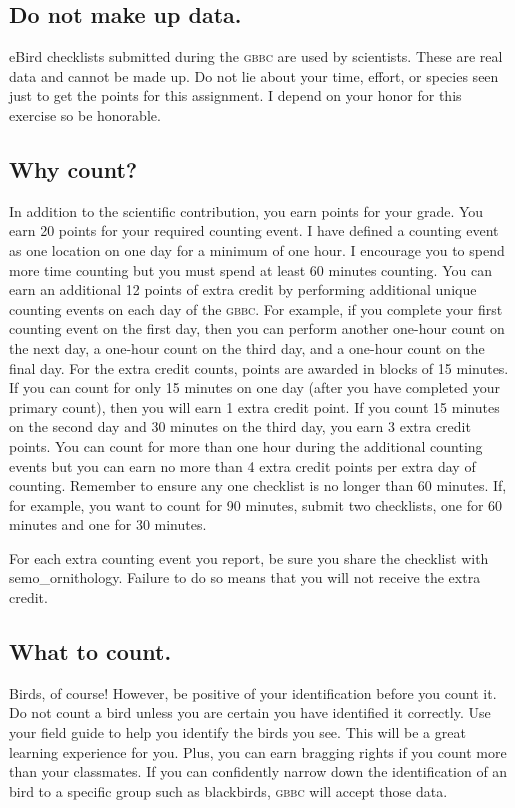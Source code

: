 \documentclass[11pt]{article}
\begin{document}
\subsection*{Do not make up data.}

eBird checklists submitted during the \textsc{gbbc} are used by scientists. These are real data and cannot be made up.  Do not lie about your time, effort, or species seen just to get the points for this assignment. I depend on your honor for this exercise so be honorable.

\subsection*{Why count?}
In addition to the scientific contribution, you earn points for your grade. You earn 20 points for your required counting event. I have defined a counting event as one location on one day for a minimum of one hour. I encourage you to spend more time counting but you must spend at least 60 minutes counting.  You can earn an additional 12 points of extra credit by performing additional unique counting events on each day of the \textsc{gbbc}. For example, if you complete your first counting event on the first day, then you can perform another one-hour count on the next day, a one-hour count on the third day, and a one-hour count on the final day.  For the extra credit counts, points are awarded in blocks of 15 minutes. If you can count for only 15 minutes on one day (after you have completed your primary count), then you will earn 1 extra credit point. If you count 15 minutes on the second day and 30 minutes on the third day, you earn 3 extra credit points.  You can count for more than one hour during the additional counting events but you can earn no more than 4 extra credit points per extra day of counting.  Remember to ensure any one checklist is no longer than 60 minutes. If, for example, you want to count for 90 minutes, submit two checklists, one for 60 minutes and one for 30 minutes.

For each extra counting event you report, be sure you share the checklist with semo\_ornithology. Failure to do so means that you will not receive the extra credit.

\subsection*{What to count.}

Birds, of course!  However, be positive of your identification before you count it. Do not count a bird unless you are certain you have identified it correctly.  Use your field guide to help you identify the birds you see. This will be a great learning experience for you. Plus, you can earn bragging rights if you count more than your classmates.  If you can confidently narrow down the identification of an bird to a specific group such as blackbirds, \textsc{gbbc} will accept those data.
\end{document}
